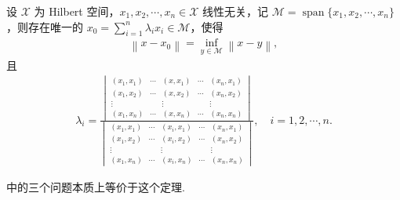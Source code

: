 \documentclass[../../main.tex]{subfiles}%
\begin{document}
\begin{theorem}
设 $\mathscr{X}$ 为 Hilbert 空间，$x_1, x_2, \cdots, x_n \in \mathscr{X}$ 线性无关，记 $\mathscr{M} = \operatorname{span}\{x_1, x_2, \cdots, x_n\}$，则存在唯一的 $x_0 = \sum\limits_{i=1}^{n} \lambda_i x_i \in \mathscr{M}$，使得
\begin{align*}
\left\| x - x_0 \right\| = \inf_{y \in \mathscr{M}} \left\| x - y \right\|,
\end{align*}
且
\begin{align*}
\lambda_i = \frac{
\begin{vmatrix}
(x_1, x_1) & \cdots & (x, x_1) & \cdots & (x_n, x_1) \\
(x_1, x_2) & \cdots & (x, x_2) & \cdots & (x_n, x_2) \\
\vdots & & \vdots & & \vdots \\
(x_1, x_n) & \cdots & (x, x_n) & \cdots & (x_n, x_n)
\end{vmatrix}
}{
\begin{vmatrix}
(x_1, x_1) & \cdots & (x_i, x_1) & \cdots & (x_n, x_1) \\
(x_1, x_2) & \cdots & (x_i, x_2) & \cdots & (x_n, x_2) \\
\vdots & & \vdots & & \vdots \\
(x_1, x_n) & \cdots & (x_i, x_n) & \cdots & (x_n, x_n)
\end{vmatrix}
}, \quad i = 1, 2, \cdots, n.
\end{align*}
\end{theorem}
\begin{remark}
中的三个问题本质上等价于这个定理.
\end{remark}
\end{document}
